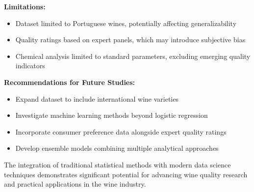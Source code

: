 \textbf{Limitations:}
\begin{itemize}
    \item Dataset limited to Portuguese wines, potentially affecting generalizability
    \item Quality ratings based on expert panels, which may introduce subjective bias
    \item Chemical analysis limited to standard parameters, excluding emerging quality indicators
\end{itemize}

\textbf{Recommendations for Future Studies:}
\begin{itemize}
    \item Expand dataset to include international wine varieties
    \item Investigate machine learning methods beyond logistic regression
    \item Incorporate consumer preference data alongside expert quality ratings
    \item Develop ensemble models combining multiple analytical approaches
\end{itemize}

The integration of traditional statistical methods with modern data science techniques demonstrates significant potential for advancing wine quality research and practical applications in the wine industry.